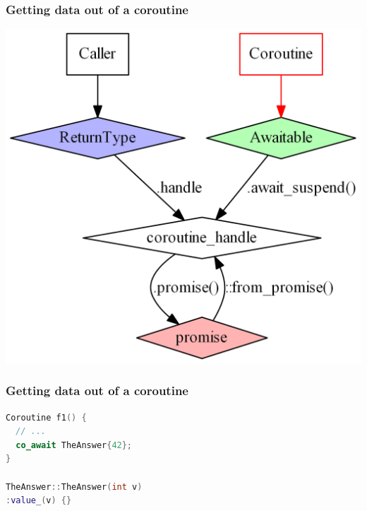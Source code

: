 \documentclass[aspectratio=169]{beamer}
\newif\iftransitions
\begin{document}
\begin{frame}[fragile]
  \frametitle{Getting data out of a coroutine}
  \iftransitions \pause \fi
  \begin{center}
  \includegraphics[height=.9\textheight]{corogfx/path_out_010.png}
  \end{center}
  
\end{frame}

\begin{frame}[fragile]
  \frametitle{Getting data out of a coroutine}
  
  \begin{lstlisting}[language={C++}]
Coroutine f1() {
  // ...
  co_await TheAnswer{42};
}

TheAnswer::TheAnswer(int v)
:value_(v) {}
  \end{lstlisting}
\end{frame}
\end{document}

